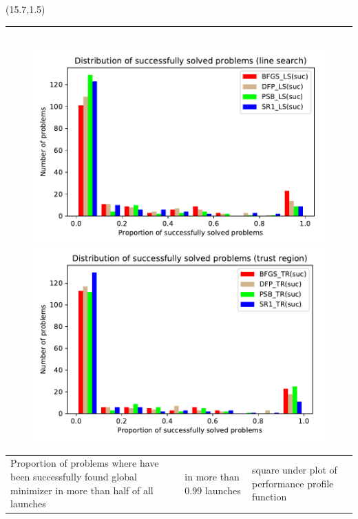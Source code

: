 \documentclass[a0]{a0poster}
\def\Head#1{\noindent{\LARGE\color{bluegray} #1}\bigskip}
\begin{document}
\begin{textblock}{7.1}(15.7,1.5)
\hrule\medskip
\Head{Results}
		
\begin{figure}
	\
	\includegraphics[width=.55\textwidth]{pic/distr_line_search.pdf}
	\includegraphics[width=.55\textwidth]{pic/distr_trust_region.pdf}%
\end{figure}
\begin{flushleft}
	\begin{tabular}{ p{18cm}|p{5cm}|p{7cm}}
		{Proportion of problems where have been successfully found global minimizer in more than half of all launches}& { in more than 0.99 launches} &square under plot of performance profile function
				\end{tabular}
		\end{flushleft}



\end{textblock}
\end{document}
